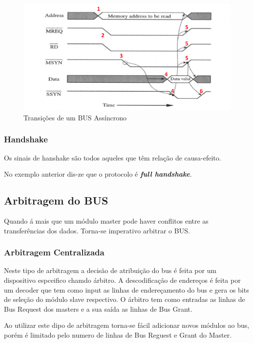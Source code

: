 \documentclass[10pt,a4paper]{paper}
\begin{document}
	\begin{figure}[ht]
		\includegraphics[scale=0.7]{fig4.png}
		\centering
		\caption{Transições de um BUS Assíncrono}
		\label{fig:figura2 }
	\end{figure}



\subsubsection*{Handshake}

Os sinais de hanshake são todos aqueles que têm relação de causa-efeito.

No exemplo anterior dis-ze que o protocolo é \textbf{\textit{full handshake}}.

\subsection*{Arbitragem do  BUS}

Quando á mais que um módulo master pode haver conflitos entre as transferências dos dados. Torna-se imperativo arbitrar o BUS.

\subsubsection*{Arbitragem Centralizada}

Neste tipo de arbitragem a decisão de atribuição do bus é feita por um dispositivo espceifico chamdo árbitro.
A descodificação de endereços é feita por um decoder que tem como input as linhas de endereçamento do bus e gera os bits de seleção do módulo slave respectivo.
O árbitro tem como entradas as linhas de Bus Request dos masters e a sua saída as linhas de Bus Grant.

Ao utilizar este dipo de arbitragem torna-se fácil adicionar novos módulos ao bus, porém é limitado pelo numero de linhas de Bus Reguest e Grant do Master.
\end{document}
